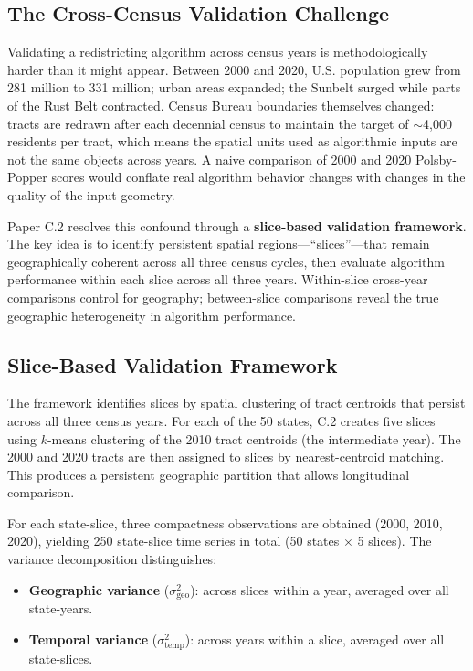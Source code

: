 
\subsection{The Cross-Census Validation Challenge}

Validating a redistricting algorithm across census years is
methodologically harder than it might appear. Between 2000 and 2020,
U.S. population grew from 281 million to 331 million; urban areas
expanded; the Sunbelt surged while parts of the Rust Belt contracted.
Census Bureau boundaries themselves changed: tracts are redrawn after
each decennial census to maintain the target of $\sim$4,000 residents
per tract, which means the spatial units used as algorithmic inputs
are not the same objects across years. A naive comparison of 2000 and
2020 Polsby-Popper scores would conflate real algorithm behavior
changes with changes in the quality of the input geometry.

Paper C.2 \citep{dellalibera2026c2} resolves this confound through a
\textbf{slice-based validation framework}. The key idea is to identify
persistent spatial regions---``slices''---that remain geographically
coherent across all three census cycles, then evaluate algorithm
performance within each slice across all three years. Within-slice
cross-year comparisons control for geography; between-slice comparisons
reveal the true geographic heterogeneity in algorithm performance.

\subsection{Slice-Based Validation Framework}

The framework identifies slices by spatial clustering of tract centroids
that persist across all three census years. For each of the 50 states,
C.2 creates five slices using $k$-means clustering of the 2010 tract
centroids (the intermediate year). The 2000 and 2020 tracts are then
assigned to slices by nearest-centroid matching. This produces a
persistent geographic partition that allows longitudinal comparison.

For each state-slice, three compactness observations are obtained
(2000, 2010, 2020), yielding 250 state-slice time series in total
(50 states $\times$ 5 slices). The variance decomposition distinguishes:
\begin{itemize}
  \item \textbf{Geographic variance} ($\sigma^2_\text{geo}$): across
    slices within a year, averaged over all state-years.
  \item \textbf{Temporal variance} ($\sigma^2_\text{temp}$): across
    years within a slice, averaged over all state-slices.
\end{itemize}

